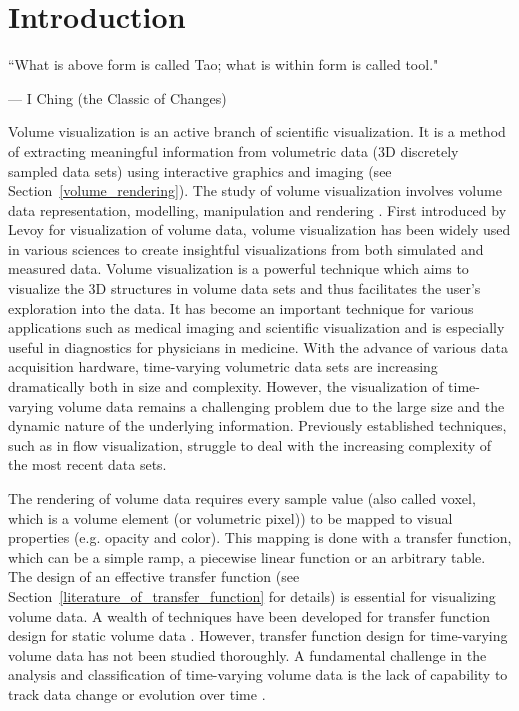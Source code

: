 \chapter{Introduction \label{section_introduction}}
\epigraph{``What is above form is called Tao; what is within form is called tool."}{--- \textup{I Ching (the Classic of Changes)}}

Volume visualization is an active branch of scientific visualization. It is a method of extracting meaningful information from volumetric data (3D discretely sampled data sets) using interactive graphics and imaging (see Section~\ref{volume_rendering}). The study of volume visualization involves volume data representation, modelling, manipulation and rendering \cite{kaufman_volume_1997}.
First introduced by Levoy \cite{levoy_display_1988} for visualization of volume data, volume visualization has been widely used in various sciences to create insightful visualizations from both simulated and measured data.
Volume visualization is a powerful technique which aims to visualize the 3D structures in volume data sets and thus facilitates the user's exploration into the data. It has become an important technique for various applications such as medical imaging and scientific visualization and is especially useful in diagnostics for physicians in medicine.
With the advance of various data acquisition hardware,
time-varying volumetric data sets are increasing dramatically both in size and complexity. However, the visualization of time-varying volume data remains a challenging problem due to the large size and the dynamic nature of the underlying information.
Previously established techniques, such as in flow visualization, struggle to deal with the increasing complexity of the most recent data sets.

The rendering of volume data requires every sample value (also called voxel, which is a volume element (or volumetric pixel)) to be mapped to visual properties (e.g. opacity and color). This mapping is done with a transfer function, which can be a simple ramp, a piecewise linear function or an arbitrary table.
The design of an effective transfer function (see Section~\ref{literature_of_transfer_function} for details) is essential for visualizing volume data. A wealth of techniques have been developed for transfer function design for static volume data \cite{kindlmann_semi-automatic_1998} \cite{pfister_transfer_2001} \cite{kniss_multidimensional_2002} \cite{bernardon_transfer-function_2008} \cite{arens_survey_2010}. However, transfer function design for time-varying volume data has not been studied thoroughly. %
A fundamental challenge in the analysis and classification of time-varying volume data is the lack of capability to %
track data change or evolution over time \cite{gu_transgraph_2011}.

